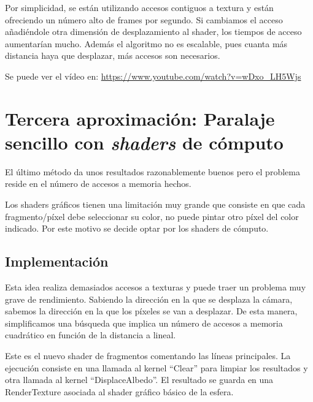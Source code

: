 Por simplicidad, se están utilizando accesos contiguos a textura y están ofreciendo un número alto de frames por segundo. Si cambiamos el acceso añadiéndole otra dimensión de desplazamiento al shader, los tiempos de acceso aumentarían mucho. Además el algoritmo no es escalable, pues cuanta más distancia haya que desplazar, más accesos son necesarios.

Se puede ver el vídeo en: \url{https://www.youtube.com/watch?v=wDxo_LH5Wjs}

\section{Tercera aproximación: Paralaje sencillo con \textit{shaders} de cómputo}
El último método da unos resultados razonablemente buenos pero el problema reside en el número de accesos a memoria hechos. 

Los shaders gráficos tienen una limitación muy grande que consiste en que cada fragmento/píxel debe seleccionar su color, no puede pintar otro píxel del color indicado. Por este motivo se decide optar por los shaders de cómputo.

\subsection{Implementación}
Esta idea realiza demasiados accesos a texturas y puede traer un problema muy grave de rendimiento. Sabiendo la dirección en la que se desplaza la cámara, sabemos la dirección en la que los píxeles se van a desplazar. De esta manera, simplificamos una búsqueda que implica un número de accesos a memoria cuadrático en función de la distancia a lineal.

Este es el nuevo shader de fragmentos comentando las líneas principales. La ejecución consiste en una llamada al kernel ``Clear'' para limpiar los resultados y otra llamada al kernel ``DisplaceAlbedo''. El resultado se guarda en una RenderTexture asociada al shader gráfico básico de la esfera.


